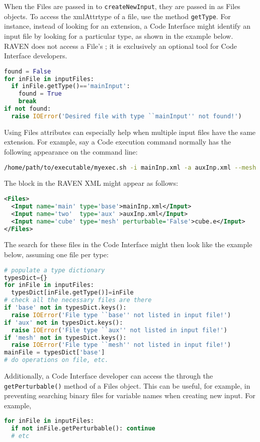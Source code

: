 When the Files are passed in to \texttt{createNewInput}, they are passed in as Files objects. To access the xmlAttr{type} of a file, use the method \texttt{getType}.  For instance, instead of looking for an extension, a Code Interface might identify an input file by looking for a particular type, as shown in the example below. \nb RAVEN does not access a File's ; it is exclusively an optional tool for Code Interface developers.

\begin{lstlisting}[language=python,showstringspaces=false]
found = False
for inFile in inputFiles:
  if inFile.getType()=='mainInput':
    found = True
    break
if not found:
  raise IOError('Desired file with type ``mainInput'' not found!')
\end{lstlisting}
Using Files  attributes can especially help when multiple input files have the same extension.  For example, say a Code execution command normally has the following appearance on the command line:
\begin{lstlisting}[language=bash]
/home/path/to/executable/myexec.sh -i mainInp.xml -a auxInp.xml --mesh cube.e
\end{lstlisting}
The  block in the RAVEN XML might appear as follows:
\begin{lstlisting}[language=XML]
<Files>
  <Input name='main' type='base'>mainInp.xml</Input>
  <Input name='two'  type='aux' >auxInp.xml</Input>
  <Input name='cube' type='mesh' perturbable='False'>cube.e</Input>
</Files>
\end{lstlisting}
The search for these files in the Code Interface might then look like the example below, assuming one file per type:
\begin{lstlisting}[language=python,showstringspaces=false]
# populate a type dictionary
typesDict={}
for inFile in inputFiles:
  typesDict[inFile.getType()]=inFile
# check all the necessary files are there
if 'base' not in typesDict.keys():
  raise IOError('File type ``base'' not listed in input file!')
if 'aux' not in typesDict.keys():
  raise IOError('File type ``aux'' not listed in input file!')
if 'mesh' not in typesDict.keys():
  raise IOError('File type ``mesh'' not listed in input file!')
mainFile = typesDict['base']
# do operations on file, etc.
\end{lstlisting}

Additionally, a Code Interface developer can access the  through the \texttt{getPerturbable()} method of a Files object.  This can be useful, for example, in preventing searching binary files for variable names when creating new input. For example,
\begin{lstlisting}[language=python]
for inFile in inputFiles:
  if not inFile.getPerturbable(): continue
  # etc
\end{lstlisting}